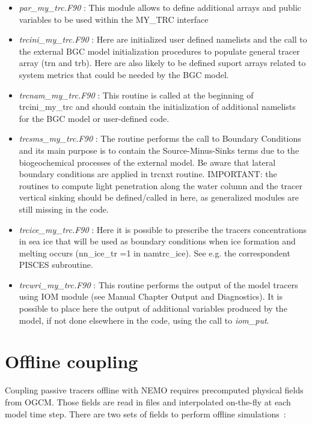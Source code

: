 \documentclass[../main/TOP_manual]{subfiles}
\begin{document}
\begin{itemize}
   \item \textit{par\_my\_trc.F90} :  This module allows to define additional arrays and public variables to be used within the MY\_TRC interface
   \item \textit{trcini\_my\_trc.F90} :  Here are initialized user defined namelists and the call to the external BGC model initialization procedures to populate general tracer array (trn and trb).
Here are also likely to be defined suport arrays related to system metrics that could be needed by the BGC model.
  \item \textit{trcnam\_my\_trc.F90} :  This routine is called at the beginning of trcini\_my\_trc and should contain the initialization of additional namelists for the BGC model or user-defined code.
  \item \textit{trcsms\_my\_trc.F90} :  The routine performs the call to Boundary Conditions and its main purpose is to contain the Source-Minus-Sinks terms due to the biogeochemical processes of the external model.
Be aware that lateral boundary conditions are applied in trcnxt routine.
IMPORTANT: the routines to compute light penetration along the water column and the tracer vertical sinking should be defined/called in here, as generalized modules are still missing in the code.
 \item \textit{trcice\_my\_trc.F90} : Here it is possible to prescribe the tracers concentrations in sea ice that will be used as boundary conditions when ice formation and melting occurs (nn\_ice\_tr =1 in namtrc\_ice).
See e.g. the correspondent PISCES subroutine.
 \item \textit{trcwri\_my\_trc.F90} : This routine performs the output of the model tracers using IOM module (see Manual Chapter Output and Diagnostics).
It is possible to place here the output of additional variables produced by the model, if not done elsewhere in the code, using the call to \textit{iom\_put}.
\end{itemize}

\section{Offline coupling}
\label{Offline}

Coupling passive tracers offline with NEMO requires precomputed physical fields from OGCM. 
Those fields are read in files and interpolated on-the-fly at each model time step. 
There are two sets of fields to perform offline simulations :
\end{document}
